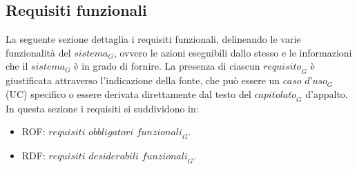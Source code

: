 \documentclass[12pt, oneside]{article}
\begin{document}
\subsection{Requisiti funzionali}
La seguente sezione dettaglia i requisiti funzionali, delineando le varie funzionalità del $\textit{sistema}_G$, ovvero le azioni eseguibili dallo stesso e le informazioni che il $\textit{sistema}_G$ è in grado di fornire. La presenza di ciascun $\textit{requisito}_G$ è giustificata attraverso l'indicazione della fonte, che può essere un $\textit{caso d'uso}_G$ (UC) specifico o essere derivata direttamente dal testo del $\textit{capitolato}_G$ d'appalto.
In questa sezione i requisiti si suddividono in:
\begin{itemize}
    \item ROF: $\textit{requisiti obbligatori funzionali}_G$.
    \item RDF: $\textit{requisiti desiderabili funzionali}_G$.
\end{itemize}
\end{document}
